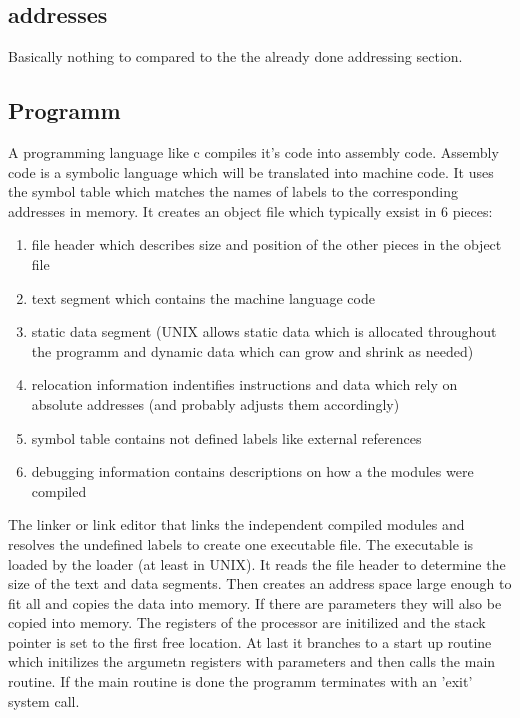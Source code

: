 \documentclass[a4paper]{scrartcl}
\begin{document}
        \subsection{addresses}
            Basically nothing to compared to the the already done addressing section.
        \subsection{Programm}
            A programming language like c compiles it's code into assembly code. Assembly code is a symbolic language which will be translated into machine code. It uses the 
            symbol table which matches the names of labels to the corresponding addresses in memory. It creates an object file which typically exsist in 6 pieces:
            \begin{enumerate}
                \item file header which describes size and position of the other pieces in the object file
                \item text segment which contains the machine language code 
                \item static data segment (UNIX allows static data which is allocated throughout the programm and dynamic data which can grow and shrink as needed)
                \item relocation information indentifies instructions and data which rely on absolute addresses (and probably adjusts them accordingly)
                \item symbol table contains not defined labels like external references
                \item debugging information contains descriptions on how a the modules were compiled 
            \end{enumerate}
            The linker or link editor that links the independent compiled modules and resolves the undefined labels to create one executable file. The executable is loaded 
            by the loader (at least in UNIX). It reads the file header to determine the size of the text and data segments. Then creates an address space large enough to fit all and
            copies the data into memory. If there are parameters they will also be copied into memory. The registers of the processor are initilized and the stack pointer is set to the
            first free location. At last it branches to a start up routine which initilizes the argumetn registers with parameters and then calls the main routine. If the main routine is done
            the programm terminates with an 'exit' system call.
\end{document}

